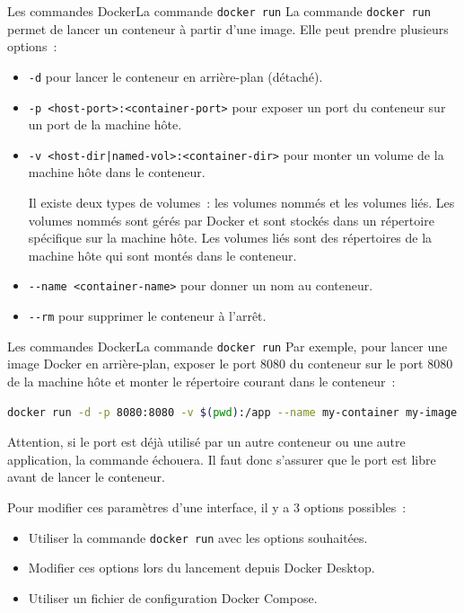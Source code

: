 \documentclass{beamer}
\begin{document}
    \begin{frame}[fragile]{Les commandes Docker}{La commande \lstinline{docker run}}
        \small
        La commande \lstinline{docker run} permet de lancer un conteneur à partir d'une image.
        \bigbreak
        Elle peut prendre plusieurs options~:
        \begin{itemize}
            \item \lstinline{-d} pour lancer le conteneur en arrière-plan (détaché).
            \item \lstinline{-p <host-port>:<container-port>} pour exposer un port du conteneur sur un port de la machine hôte.
            \item \lstinline{-v <host-dir|named-vol>:<container-dir>} pour monter un volume de la machine hôte dans le conteneur.
            \begin{dangercolorbox}
                Il existe deux types de volumes~: les volumes nommés et les volumes liés.
                Les volumes nommés sont gérés par Docker et sont stockés dans un répertoire spécifique sur la machine hôte.
                Les volumes liés sont des répertoires de la machine hôte qui sont montés dans le conteneur.
            \end{dangercolorbox}
            \item \lstinline{--name <container-name>} pour donner un nom au conteneur.
            \item \lstinline{--rm} pour supprimer le conteneur à l'arrêt.
        \end{itemize}
    \end{frame}

    \begin{frame}[fragile]{Les commandes Docker}{La commande \lstinline{docker run}}
        \small
        Par exemple, pour lancer une image Docker en arrière-plan, exposer le port 8080 du conteneur sur le port 8080 de la machine hôte et monter le répertoire courant dans le conteneur~:
        \begin{lstlisting}[language=bash]
docker run -d -p 8080:8080 -v $(pwd):/app --name my-container my-image
        \end{lstlisting}
        \bigbreak
        \begin{dangercolorbox}
            Attention, si le port est déjà utilisé par un autre conteneur ou une autre application, la commande échouera.
            Il faut donc s'assurer que le port est libre avant de lancer le conteneur.
        \end{dangercolorbox}
        \bigbreak
        Pour modifier ces paramètres d'une interface, il y a 3 options possibles~:
        \begin{itemize}
            \item Utiliser la commande \lstinline{docker run} avec les options souhaitées.
            \item Modifier ces options lors du lancement depuis Docker Desktop.
            \item Utiliser un fichier de configuration Docker Compose.
        \end{itemize}
    \end{frame}
\end{document}
